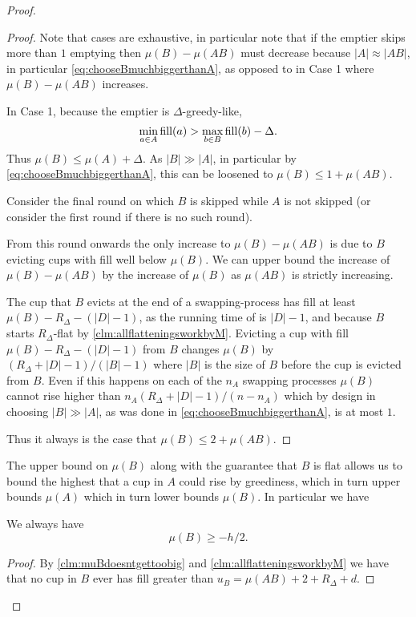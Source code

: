 \begin{proof}
\begin{proof}
  Note that cases are exhaustive, in particular note that if the
  emptier skips more than $1$ emptying then $\mu(B) - \mu(AB)$
  must decrease because $|A|\approx |AB|$, in particular
  \eqref{eq:chooseBmuchbiggerthanA}, as opposed to in Case 1
  where $\mu(B) - \mu(AB)$ increases.

  In Case 1, because the emptier is $\Delta$-greedy-like,
  $$\min_{a\in A} \operatorname{\textnormal{fill}}(a) > \max_{b\in B} \operatorname{\textnormal{fill}}(b) - \Delta.$$
  Thus $\mu(B) \le \mu(A) + \Delta$. As $|B| \gg |A|$, in
  particular by \eqref{eq:chooseBmuchbiggerthanA}, this can be
  loosened to $\mu(B) \le 1 + \mu(A B)$.

  Consider the final round on which $B$ is skipped while $A$ is
  not skipped (or consider the first round if there is no such
  round).

  From this round onwards the only increase to $\mu(B) - \mu(A
  B)$ is due to $B$ evicting cups with fill well below $\mu(B)$.
  We can upper bound the increase of $\mu(B) - \mu(A B)$ by the
  increase of $\mu(B)$ as $\mu(A B)$ is strictly increasing.

  The cup that $B$ evicts at the end of a
  swapping-process has fill at least $\mu(B) - R_\Delta -
  (|D|-1)$, as the running time of \randalg is $|D|-1$, and
  because $B$ starts $R_\Delta$-flat by
  \cref{clm:allflatteningsworkbyM}. Evicting a cup
  with fill $\mu(B) - R_\Delta - (|D| -1)$ from $B$ changes
  $\mu(B)$ by $(R_\Delta + |D| - 1) / (|B|-1)$ where $|B|$ is the
  size of $B$ before the cup is evicted from $B$. Even if this
  happens on each of the $n_A$ swapping processes $\mu(B)$ cannot
  rise higher than $n_A (R_\Delta + |D|-1) / (n-n_A)$ which by
  design in choosing $|B| \gg |A|$, as was done in
  \eqref{eq:chooseBmuchbiggerthanA}, is at most $1$.

  Thus it always is the case that $\mu(B) \le 2 + \mu(A B).$

\end{proof}

The upper bound on $\mu(B)$ along with the guarantee that $B$ is
flat allows us to bound the highest that a cup in $A$ could rise
by greediness, which in turn upper bounds $\mu(A)$ which in turn
lower bounds $\mu(B)$. In particular we have
\begin{clm}
  \label{clm:muBgreaterthanminushover2}
  We always have
  $$\mu(B) \ge -h/2.$$
\end{clm}
\begin{proof}
  By \cref{clm:muBdoesntgettoobig} and \cref{clm:allflatteningsworkbyM} 
  we have that no cup in $B$ ever has fill greater than
  $u_B = \mu(A B) + 2 + R_\Delta + d$. 


\end{proof}
\end{proof}
